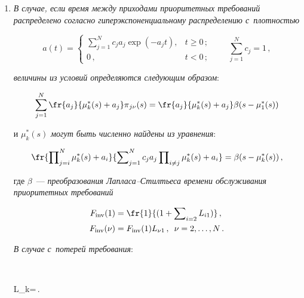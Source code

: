 \begin{enumerate}[1.]

\item 

\textit{В случае, если время между приходами приоритетных требований распределено согласно гиперэкспоненциальному распределению с~плотностью}

$$

a(t)=\begin{cases}

\displaystyle\sum\limits_{j=1}^{N}c_{j}a_{j}\exp(-a_{j}t), & t\geq0\,;\\

0\,, & t<0\,;

\end{cases}

\qquad

\sum\limits_{j=1}^{N}c_{j}=1\,,

$$

\textit{величины из условий определяются следующим образом}:

$$

\sum\limits_{j=1}^{N}\fr{a_{j}}{\mu_{k}^{*}(s)+a_{j}}\pi{}_{j\nu}(s)=\fr{a_{j}}{\mu_{k}^{*}(s)+a_{j}}\beta(s-\mu_{1}^{*}(s))

$$

и $\mu_{k}^{*}(s)$ \textit{могут быть численно найдены из уравнения}:

$$

\fr{\prod\nolimits_{j=i}^{N}\mu_{k}^{*}(s)+a_{i}}{\sum\nolimits_{j=1}^{N}c_{j}a_{j}\prod\nolimits_{i\ne j}

\mu_{k}^{*}(s)+a_{i}}=\beta(s-\mu_{k}^{*}(s))\,,

$$

где $\beta$~--- \textit{преобразования Лапласа--Стилтьеса времени обслуживания приоритетных требований}

\begin{align*}

F_{\mathrm{inv}}(1)&=\fr{1}{(1+\sum\nolimits_{i=2}L_{i1})}\,,

\\

F_{\mathrm{inv}}(\nu)&=F_{\mathrm{inv}}(1) L_{\nu1}\,,\enskip \nu=2,\ldots ,N\,.

\end{align*}



\textit{В случае с~потерей требования}:

$$

L_{\nu k}=\,.


\end{enumerate}
